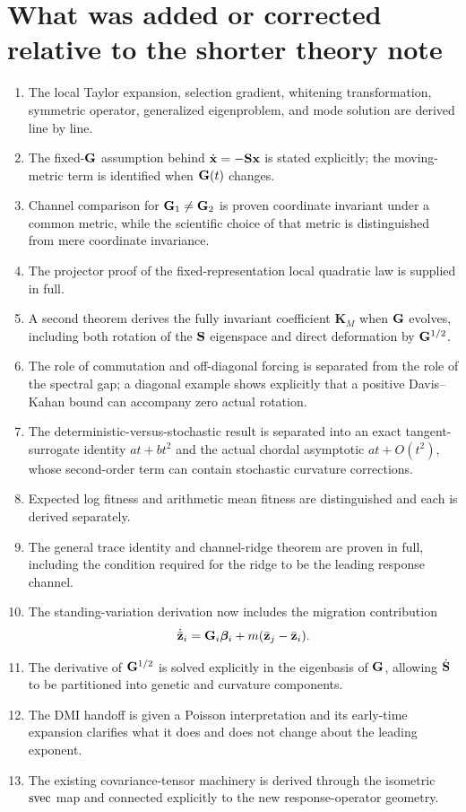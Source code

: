 \chapter{What was added or corrected relative to the shorter theory note}

\begin{enumerate}[leftmargin=1.6em]
\item The local Taylor expansion, selection gradient, whitening transformation, symmetric operator, generalized eigenproblem, and mode solution are derived line by line.
\item The fixed-\(\mathbf{G}\) assumption behind \(\dot{\mathbf x}=-\mathbf{S}\mathbf x\) is stated explicitly; the moving-metric term is identified when \(\mathbf{G}(t)\) changes.
\item Channel comparison for \(\mathbf{G}_1\neq\mathbf{G}_2\) is proven coordinate invariant under a common metric, while the scientific choice of that metric is distinguished from mere coordinate invariance.
\item The projector proof of the fixed-representation local quadratic law is supplied in full.
\item A second theorem derives the fully invariant coefficient \(\mathbf K_M\) when \(\mathbf{G}\) evolves, including both rotation of the \(\mathbf{S}\) eigenspace and direct deformation by \(\mathbf{G}^{1/2}\).
\item The role of commutation and off-diagonal forcing is separated from the role of the spectral gap; a diagonal example shows explicitly that a positive Davis--Kahan bound can accompany zero actual rotation.
\item The deterministic-versus-stochastic result is separated into an exact tangent-surrogate identity \(a t+b t^2\) and the actual chordal asymptotic \(a t+O(t^2)\), whose second-order term can contain stochastic curvature corrections.
\item Expected log fitness and arithmetic mean fitness are distinguished and each is derived separately.
\item The general trace identity and channel-ridge theorem are proven in full, including the condition required for the ridge to be the leading response channel.
\item The standing-variation derivation now includes the migration contribution
\[
\dot{\bar{\mathbf z}}_i=\mathbf{G}_i\boldsymbol{\beta}_i+m(\bar{\mathbf z}_j-\bar{\mathbf z}_i).
\]
\item The derivative of \(\mathbf{G}^{1/2}\) is solved explicitly in the eigenbasis of \(\mathbf{G}\), allowing \(\dot{\mathbf{S}}\) to be partitioned into genetic and curvature components.
\item The DMI handoff is given a Poisson interpretation and its early-time expansion clarifies what it does and does not change about the leading exponent.
\item The existing covariance-tensor machinery is derived through the isometric \(\operatorname{svec}\) map and connected explicitly to the new response-operator geometry.
\end{enumerate}


